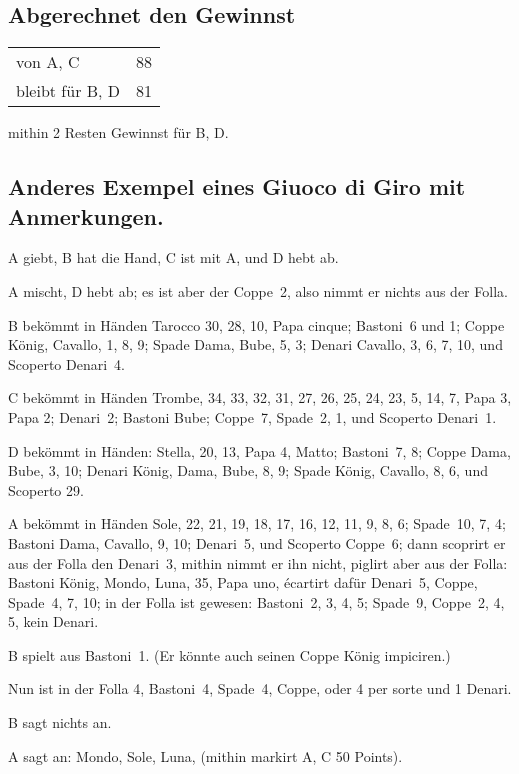 \documentclass[11pt,a6paper,twoside]{article}
\begin{document}
\subsection{Abgerechnet den Gewinnst}

\begin{tabular}{@{}b{6.5cm}r}
  von A, C &88\\
bleibt für B, D &81\\
\end{tabular}

mithin 2 Resten Gewinnst für B, D.

\subsection{Anderes Exempel eines Giuoco di Giro mit Anmerkungen.}

A giebt, B hat die Hand, C ist mit A, und D hebt ab.

A mischt, D hebt ab; es ist aber der Coppe~2, also nimmt er nichts aus der Folla.

B bekömmt in Händen Tarocco 30, 28, 10, Papa cinque; Bastoni~6 und 1; Coppe König, Cavallo, 1, 8, 9; Spade Dama, Bube, 5, 3; Denari Cavallo, 3, 6, 7, 10, und Scoperto Denari~4.

C bekömmt in Händen Trombe, 34, 33, 32, 31, 27, 26, 25, 24, 23, 5, 14, 7, Papa 3, Papa 2; Denari~2; Bastoni Bube; Coppe~7, Spade~2, 1, und Scoperto Denari~1.

D bekömmt in Händen: Stella, 20, 13, Papa 4, Matto; Bastoni~7, 8; Coppe Dama, Bube, 3, 10; Denari König, Dama, Bube, 8, 9; Spade König, Cavallo, 8, 6, und Scoperto 29.

A bekömmt in Händen Sole, 22, 21, 19, 18, 17, 16, 12, 11, 9, 8, 6; Spade~10, 7, 4; Bastoni Dama, Cavallo, 9, 10; Denari~5, und Scoperto Coppe~6; dann scoprirt er aus der Folla den Denari~3, mithin nimmt er ihn nicht, piglirt aber aus der Folla: Bastoni König, Mondo, Luna, 35, Papa uno, écartirt dafür Denari~5, Coppe, Spade~4, 7, 10; in der Folla ist gewesen: Bastoni~2, 3, 4, 5; Spade~9, Coppe~2, 4, 5, kein Denari.

B spielt aus Bastoni~1. (Er könnte auch seinen Coppe König impiciren.)

Nun ist in der Folla 4, Bastoni~4, Spade~4, Coppe, oder 4 per sorte und 1 Denari.

B sagt nichts an.

A sagt an: Mondo, Sole, Luna, (mithin markirt A, C 50 Points).
\end{document}
